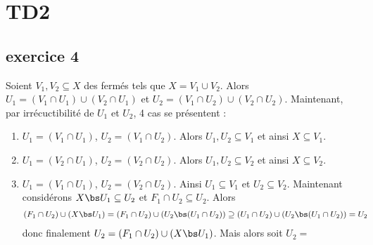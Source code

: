 \chapter{TD2}
    \section{exercice 4}
        Soient $V_1, V_2 \subseteq X$ des fermés tels que $X = V_1 \cup V_2$. Alors $U_1 = (V_1 \cap U_1) \cup (V_2 \cap U_1)$ et $U_2 = (V_1 \cap U_2) \cup (V_2 \cap U_2)$. Maintenant, par irrécuctibilité de $U_1$ et $U_2$, 4 cas se présentent :
        \begin{enumerate}
            \item $U_1 = (V_1 \cap U_1)$, $U_2 = (V_1 \cap U_2)$. Alors $U_1, U_2 \subseteq V_1$ et ainsi $X \subseteq V_1$.
            \item $U_1 = (V_2 \cap U_1)$, $U_2 = (V_2 \cap U_2)$. Alors $U_1, U_2 \subseteq V_2$ et ainsi $X \subseteq V_2$.
            \item $U_1 = (V_1 \cap U_1)$, $U_2 = (V_2 \cap U_2)$. Ainsi $U_1 \subseteq V_1$ et $U_2 \subseteq V_2$. Maintenant considérons $X \bs U_1 \subseteq U_2$ et $F_1 \cap U_2 \subseteq U_2$. Alors
            \begin{align*}
                (F_1 \cap U_2) \cup (X \bs U_1) &= (F_1 \cap U_2) \cup (U_2 \bs (U_1 \cap U_2)) \supseteq (U_1 \cap U_2) \cup (U_2 \bs (U_1 \cap U_2)) = U_2
            \end{align*}
            donc finalement $U_2 = (F_1 \cap U_2) \cup (X \bs U_1)$. Mais alors soit $U_2 = $
        \end{enumerate}
